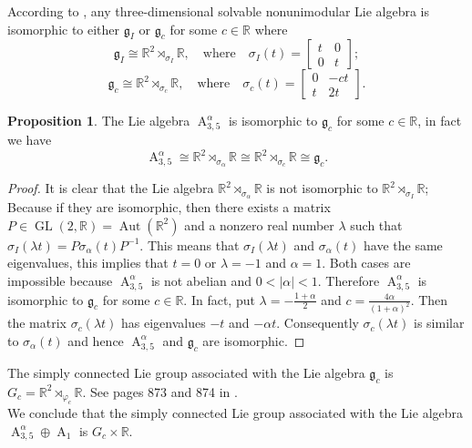 \documentclass[12pt,a4paper,twoside]{article}
\theoremstyle{definition}
\newtheorem{proposition}{Proposition}[section]
\newcommand{\edit}[1]{\textcolor{myeditcolor}{#1}}
\begin{document}
According to \cite{ha2009left}, any three-dimensional solvable nonunimodular Lie algebra is isomorphic to either $\mathfrak{g}_I$ or $\mathfrak{g}_c$ for some $c \in \mathbb{R}$ where
$$\mathfrak{g}_I \cong \mathbb{R}^2 \rtimes_{\sigma_{I}}\mathbb{R}, \quad\text{where}\quad \sigma_{I}(t) = \begin{bmatrix}
t & 0\\
0 & t
\end{bmatrix};$$
$$\mathfrak{g}_c \cong \mathbb{R}^2 \rtimes_{\sigma_{c}}\mathbb{R}, \quad\text{where}\quad \sigma_{c}(t) = \begin{bmatrix}
0 & -ct\\
t & 2t
\end{bmatrix}.$$
\begin{proposition}
The Lie algebra $\operatorname{A}_{3, 5}^{\alpha}$ is isomorphic to $\mathfrak{g}_c$ for some $c \in \mathbb{R}$, in fact we have
$$\operatorname{A}_{3, 5}^{\alpha} \cong \mathbb{R}^2 \rtimes_{\sigma_{\alpha}}\mathbb{R} \cong \mathbb{R}^2 \rtimes_{\sigma_{c}}\mathbb{R} \cong \mathfrak{g}_c.$$
\end{proposition}
\begin{proof}
It is clear that the Lie algebra $\mathbb{R}^2 \rtimes_{\sigma_{\alpha}}\mathbb{R}$ is not isomorphic to $\mathbb{R}^2 \rtimes_{\sigma_{I}}\mathbb{R}$; Because if they are isomorphic, then there exists a matrix $P \in \operatorname{GL}(2, \mathbb{R}) = \operatorname{Aut}(\mathbb{R}^2)$ \edit{and a nonzero real number $\lambda$ such that $\sigma_{I}(\lambda t) = P\sigma_{\alpha}(t)P^{-1}$. This means that $\sigma_{I}(\lambda t)$ and $\sigma_{\alpha}(t)$ have the same eigenvalues, this implies that $t = 0$ or $\lambda = -1$ and $\alpha = 1$. Both cases are impossible because $\operatorname{A}_{3, 5}^{\alpha}$ is not abelian and $0 < |\alpha| < 1$. Therefore $\operatorname{A}_{3, 5}^{\alpha}$ is isomorphic to $\mathfrak{g}_c$ for some $c \in \mathbb{R}$. In fact, put $\lambda = -\frac{1 + \alpha}{2}$ and $c = \frac{4\alpha}{(1 + \alpha)^2}$. Then the matrix $\sigma_{c}(\lambda t)$ has eigenvalues $-t$ and $-\alpha t$. Consequently $\sigma_{c}(\lambda t)$ is similar to $\sigma_{\alpha}(t)$ and hence $\operatorname{A}_{3, 5}^{\alpha}$ and $\mathfrak{g}_c$ are isomorphic.}
\end{proof}
The simply connected Lie group associated with the Lie algebra $\mathfrak{g}_c$ is $G_c = \mathbb{R}^2 \rtimes_{\varphi_{c}}\mathbb{R}$. See pages 873 and 874 in \cite{ha2009left}.\\
We conclude that the simply connected Lie group associated with the Lie algebra $\operatorname{A}_{3, 5}^{\alpha} \oplus \operatorname{A}_1$ is $G_c \times \mathbb{R}$.
\end{document}
